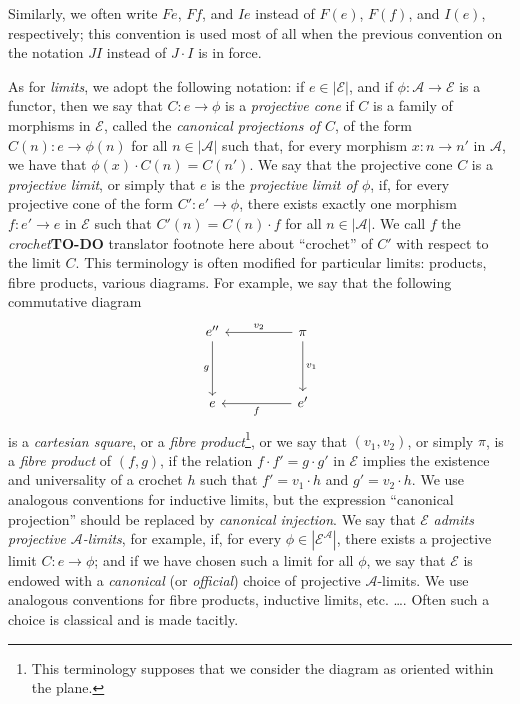 \documentclass[fleqn]{article}
\newcommand{\oldpage}[1]{\marginpar{\footnotesize$\Big\vert$ \textit{p.~#1}}}
\newcommand{\todo}{{\color{purple}\textbf{TO-DO }}}
\newcommand{\cat}[1]{\mathcal{#1}}
\newcommand{\set}[1]{|#1|}
\begin{document}
Similarly, we often write $Fe$, $Ff$, and $Ie$ instead of $F(e)$, $F(f)$, and $I(e)$, respectively; this convention is used most of all when the previous convention on the notation $JI$ instead of $J\cdot I$ is in force.

As for \emph{limits}, we adopt the following notation: if $e\in\set{\cat{E}}$, and if $\phi\colon \cat{A}\to\cat{E}$ is a functor, then we say that $C\colon e\to\phi$ is a \emph{projective cone} if $C$ is a family of morphisms in $\cat{E}$, called the \emph{canonical projections of $C$}, of the form $C(n)\colon e\to\phi(n)$ for all $n\in\set{\cat{A}}$ such that, for every morphism $x\colon n\to n'$ in $\cat{A}$, we have that $\phi(x)\cdot C(n)=C(n')$.
We say that the projective cone $C$ is a \emph{projective limit}, or simply that $e$ is the \emph{projective limit of $\phi$}, if, for every projective cone of the form $C'\colon e'\to\phi$, there exists exactly one morphism $f\colon e'\to e$ in $\cat{E}$ such that $C'(n)=C(n)\cdot f$ for all $n\in\set{\cat{A}}$.
We call $f$ the \emph{crochet}\todo{translator footnote here about ``crochet''} of $C'$ with respect to the limit $C$.
This terminology is often modified for particular limits: products, fibre products, various diagrams.
For example, we say that the following commutative diagram
\oldpage{222}
\[
  \begin{tikzcd}[sep=huge]
    e'' \ar[d,swap,"g"]
  & \pi \ar[l,swap,"v_2"] \ar[d,"v_1"]
  \\e
  & e' \ar[l,"f"]
  \end{tikzcd}
\]
is a \emph{cartesian square}, or a \emph{fibre product}\footnote{This terminology supposes that we consider the diagram as oriented within the plane.}, or we say that $(v_1,v_2)$, or simply $\pi$, is a \emph{fibre product} of $(f,g)$, if the relation $f\cdot f'=g\cdot g'$ in $\cat{E}$ implies the existence and universality of a crochet $h$ such that $f'=v_1\cdot h$ and $g'=v_2\cdot h$.
We use analogous conventions for inductive limits, but the expression ``canonical projection''  should be replaced by \emph{canonical injection}.
We say that $\cat{E}$ \emph{admits projective $\cat{A}$-limits}, for example, if, for every $\phi\in\set{\cat{E}^\cat{A}}$, there exists a projective limit $C\colon e\to\phi$;
and if we have chosen such a limit for all $\phi$, we say that $\cat{E}$ is endowed with a \emph{canonical} (or \emph{official}) choice of projective $\cat{A}$-limits.
We use analogous conventions for fibre products, inductive limits, etc. \ldots.
Often such a choice is classical and is made tacitly.
\end{document}
